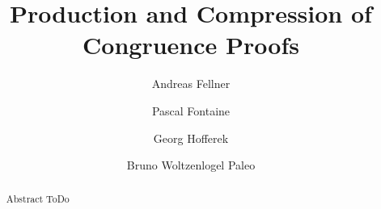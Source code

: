 \documentclass[a4paper,11pt]{article}
\begin{document}
\title{Production and Compression of Congruence Proofs}

\author[1]{Andreas Fellner}
\author[2]{Pascal Fontaine}
\author[3]{Georg Hofferek}
\author[4]{Bruno Woltzenlogel Paleo}

\date{}

\maketitle

\begin{abstract}
Abstract ToDo

\end{abstract}


\label{sec:proofcompression}























\end{document}
